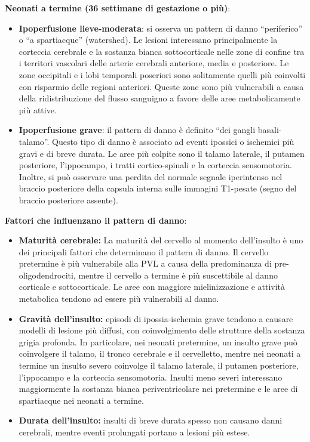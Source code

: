 \textbf{Neonati a termine (36 settimane di gestazione o più)}:

\begin{itemize}
	\tightlist
	\item
	\textbf{Ipoperfusione lieve-moderata}: si osserva un pattern di danno ``periferico'' o ``a spartiacque'' (watershed). Le lesioni interessano principalmente la corteccia cerebrale e la sostanza bianca sottocorticale nelle zone di confine tra i territori vascolari delle arterie cerebrali anteriore, media e posteriore. Le zone occipitali e i lobi temporali poseriori sono solitamente quelli più coinvolti con risparmio delle regioni anteriori. Queste zone sono più vulnerabili a causa della ridistribuzione del flusso sanguigno a favore delle aree metabolicamente più attive.
	\item
	\textbf{Ipoperfusione grave}: il pattern di danno è definito ``dei gangli basali-talamo''. Questo tipo di danno è associato ad eventi ipossici o ischemici più gravi e di breve durata. Le aree più colpite sono il talamo laterale, il putamen posteriore, l'ippocampo, i tratti cortico-spinali e la corteccia sensomotoria. Inoltre, si può osservare una perdita del normale segnale iperintenso nel braccio posteriore della capsula interna sulle immagini T1-pesate (segno del braccio posteriore assente).
\end{itemize}

\textbf{Fattori che influenzano il pattern di danno}:

\begin{itemize}
	\tightlist
	\item
	\textbf{Maturità cerebrale:} La maturità del cervello al momento dell'insulto è uno dei principali fattori che determinano il pattern di danno. Il cervello pretermine è più vulnerabile alla PVL a causa della predominanza di pre-oligodendrociti, mentre il cervello a termine è più suscettibile al danno corticale e sottocorticale. Le aree con maggiore mielinizzazione e attività metabolica tendono ad essere più vulnerabili al danno.
	\item
	\textbf{Gravità dell'insulto:} episodi di ipossia-ischemia grave tendono a causare modelli di lesione più diffusi, con coinvolgimento delle strutture della sostanza grigia profonda. In particolare, nei neonati pretermine, un insulto grave può coinvolgere il talamo, il tronco cerebrale e il cervelletto, mentre nei neonati a termine un insulto severo coinvolge il talamo laterale, il putamen posteriore, l'ippocampo e la corteccia sensomotoria. Insulti meno severi interessano maggiormente la sostanza bianca periventricolare nei pretermine e le aree di spartiacque nei neonati a termine.
	\item
	\textbf{Durata dell'insulto:} insulti di breve durata spesso non causano danni cerebrali, mentre eventi prolungati portano a lesioni più estese.
\end{itemize}

